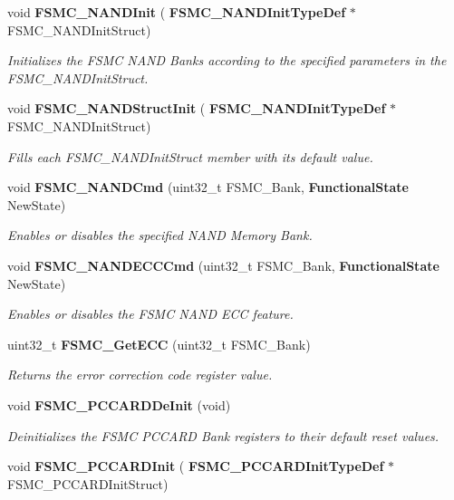 \begin{DoxyCompactItemize}
void \textbf{ F\+S\+M\+C\+\_\+\+N\+A\+N\+D\+Init} (\textbf{ F\+S\+M\+C\+\_\+\+N\+A\+N\+D\+Init\+Type\+Def} $\ast$F\+S\+M\+C\+\_\+\+N\+A\+N\+D\+Init\+Struct)
\begin{DoxyCompactList}\small\item\em Initializes the F\+S\+MC N\+A\+ND Banks according to the specified parameters in the F\+S\+M\+C\+\_\+\+N\+A\+N\+D\+Init\+Struct. \end{DoxyCompactList}\item 
void \textbf{ F\+S\+M\+C\+\_\+\+N\+A\+N\+D\+Struct\+Init} (\textbf{ F\+S\+M\+C\+\_\+\+N\+A\+N\+D\+Init\+Type\+Def} $\ast$F\+S\+M\+C\+\_\+\+N\+A\+N\+D\+Init\+Struct)
\begin{DoxyCompactList}\small\item\em Fills each F\+S\+M\+C\+\_\+\+N\+A\+N\+D\+Init\+Struct member with its default value. \end{DoxyCompactList}\item 
void \textbf{ F\+S\+M\+C\+\_\+\+N\+A\+N\+D\+Cmd} (uint32\+\_\+t F\+S\+M\+C\+\_\+\+Bank, \textbf{ Functional\+State} New\+State)
\begin{DoxyCompactList}\small\item\em Enables or disables the specified N\+A\+ND Memory Bank. \end{DoxyCompactList}\item 
void \textbf{ F\+S\+M\+C\+\_\+\+N\+A\+N\+D\+E\+C\+C\+Cmd} (uint32\+\_\+t F\+S\+M\+C\+\_\+\+Bank, \textbf{ Functional\+State} New\+State)
\begin{DoxyCompactList}\small\item\em Enables or disables the F\+S\+MC N\+A\+ND E\+CC feature. \end{DoxyCompactList}\item 
uint32\+\_\+t \textbf{ F\+S\+M\+C\+\_\+\+Get\+E\+CC} (uint32\+\_\+t F\+S\+M\+C\+\_\+\+Bank)
\begin{DoxyCompactList}\small\item\em Returns the error correction code register value. \end{DoxyCompactList}\item 
void \textbf{ F\+S\+M\+C\+\_\+\+P\+C\+C\+A\+R\+D\+De\+Init} (void)
\begin{DoxyCompactList}\small\item\em Deinitializes the F\+S\+MC P\+C\+C\+A\+RD Bank registers to their default reset values. \end{DoxyCompactList}\item 
void \textbf{ F\+S\+M\+C\+\_\+\+P\+C\+C\+A\+R\+D\+Init} (\textbf{ F\+S\+M\+C\+\_\+\+P\+C\+C\+A\+R\+D\+Init\+Type\+Def} $\ast$F\+S\+M\+C\+\_\+\+P\+C\+C\+A\+R\+D\+Init\+Struct)

\end{DoxyCompactItemize}
